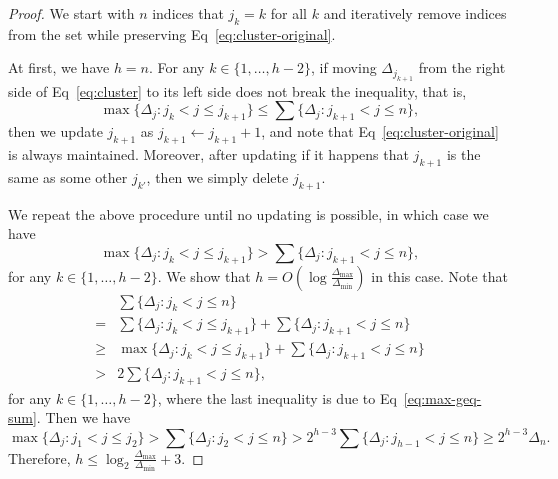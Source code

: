 \documentclass[a4paper,UKenglish,cleveref, autoref, thm-restate, pdfa]{lipics-v2021}
\renewcommand{\leq}{\leqslant}
\renewcommand{\geq}{\geqslant}
\begin{document}
\begin{proof}
    We start with $n$ indices that $j_k=k$ for all $k$ and iteratively remove indices from the set while preserving Eq~\eqref{eq:cluster-original}. 
   
   At first, we have $h=n$. For any $k \in \{1, \ldots, h-2\}$, if moving $\Delta_{j_{k+1}}$ from the right side of Eq~\eqref{eq:cluster} to its left side does not break the inequality, that is,
    \[
            \max\{\Delta_j : j_k < j \leq j_{k+1}\} \leq \sum\{\Delta_j : j_{k+1} < j \leq n\},
    \]
    then we update $j_{k+1}$ as $j_{k+1}\leftarrow j_{k+1}+1$, and note that Eq~\eqref{eq:cluster-original} is always maintained. Moreover, after updating if it happens that $j_{k+1}$ is the same as some other $j_{k'}$, then we simply delete $j_{k+1}$.  

  We repeat the above procedure until no updating is possible, in which case we have
    \begin{equation}\label{eq:max-geq-sum}
            \max\{\Delta_j : j_k < j \leq j_{k+1}\} > \sum\{\Delta_j : j_{k+1} < j \leq n\},
    \end{equation}
    for any $k \in \{1, \ldots, h-2\}$. We show that $h = O(\log\frac{\Delta_{\max}}{\Delta_{\min}})$ in this case. Note that 
    \begin{align*}
        &\sum\{\Delta_j : j_{k} < j \leq n\} \\
        =&\sum\{\Delta_j : j_{k} < j \leq j_{k+1}\}+\sum\{\Delta_j : j_{k+1} < j \leq n\}\\
        \geq& \max\{\Delta_j : j_k < j \leq j_{k+1}\} + \sum\{\Delta_j : j_{k+1} < j \leq n\} 
        \\>& 2 \sum\{\Delta_j : j_{k+1} < j \leq n\}, 
    \end{align*}
    for any $k \in \{1, \ldots, h-2\}$,  where the last inequality is due to Eq~\eqref{eq:max-geq-sum}. Then we have 
    \[
        \max\{\Delta_j : j_1 < j \leq j_{2}\} > \sum\{\Delta_j : j_{2} < j \leq n\} > 2^{h-3}\sum\{\Delta_j : j_{h-1} <  j \leq n\} \geq 2^{h-3}\Delta_n.
    \]
    Therefore, $h \leq \log_2 \frac{\Delta_{\max}}{\Delta_{\min}} + 3$.
\end{proof}
\end{document}
